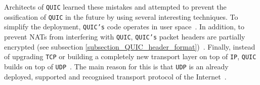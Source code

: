 \documentclass[12pt,a4paper]{report}
\begin{document}
Architects of \texttt{QUIC} learned these mistakes and attempted to prevent the ossification of \texttt{QUIC} in the future by using several interesting techniques.
To simplify the deployment, \texttt{QUIC's} code operates in user space~\cite{quic-and-http-3-too-big-to-fail}.
In addition, to prevent NATs from interfering with \texttt{QUIC}, \texttt{QUIC's} packet headers are partially encrypted (see subsection \ref{subsection_QUIC_header_format})~\cite{bib_Netdev_0x13_QUIC_Tutorial}.
Finally, instead of upgrading \texttt{TCP} or building a completely new transport layer on top of \texttt{IP}, \texttt{QUIC} builds on top of \texttt{UDP}~\cite{chromium_blog_about_quic}.
The main reason for this is that \texttt{UDP} is an already deployed, supported and recognised transport protocol of the Internet~\cite{the-road-to-quic}.
\end{document}
